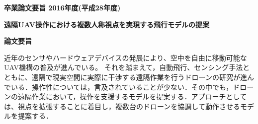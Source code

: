 \begin{center}
\textbf{\Large 卒業論文要旨 2016年度(平成28年度)}

\vspace{6.18mm}

\textbf{\Large 遠隔UAV操作における複数人称視点を実現する飛行モデルの提案}
\end{center}

\vspace{10mm}

\begin{flushleft}
\textbf{論文要旨}\\
\end{flushleft}

近年のセンサやハードウェアデバイスの発展により、空中を自由に移動可能なUAV機構の普及が進んでいる。
それを踏まえて，自動飛行、センシング手法とともに、遠隔で現実空間に実際に干渉する遠隔作業を行うドローンの研究が進んでいる．操作性については，言及されていることが少ない．その中でも，ドローンの遠隔作業において，操作を支援するモデルを提案する．アプローチとしては、視点を拡張することに着目し，複数台のドローンを協調して動作させるモデルを提案する．





